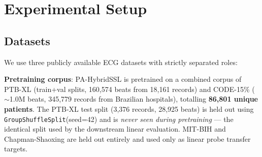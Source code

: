 \documentclass[journal,10pt]{IEEEtran}
\begin{document}

\section{Experimental Setup}
\label{sec:experiments}

\subsection{Datasets}

We use three publicly available ECG datasets with strictly separated roles:

\begin{table}[h]
\centering
\caption{Dataset characteristics. The 250-sample windows strictly correspond to 0.5\,s of signal sampled at 500\,Hz (centered on R-peaks), fully preserving high-frequency morphological features like QRS sharpness. CODE-15\% uses harmonized 250-sample segments. All datasets are processed to this unified 500\,Hz format.}
\label{tab:datasets}
\end{table}

\noindent\textbf{Pretraining corpus}: PA-HybridSSL is pretrained on a combined corpus of PTB-XL (train+val splits, 160,574 beats from 18,161 records) and CODE-15\% ($\sim$1.0M beats, 345,779 records from Brazilian hospitals), totalling \textbf{86,801 unique patients}. The PTB-XL test split (3,376 records, 28,925 beats) is held out using \texttt{GroupShuffleSplit}(seed=42) and is \emph{never seen during pretraining} --- the identical split used by the downstream linear evaluation. MIT-BIH and Chapman-Shaoxing are held out entirely and used only as linear probe transfer targets.
\end{document}
